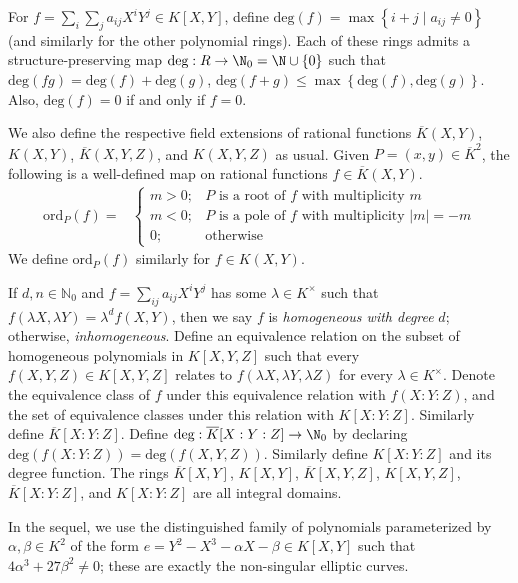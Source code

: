 \documentclass[11pt,letterpaper]{article}
\newcommand{\polys}{K[X,Y]}
\theoremstyle{definition}
\newcommand{\6}{\mathbf}
\newcommand{\7}{\mathcal}
\begin{document}
For $f = \sum_i \sum_j a_{ij} X^iY^j \in \polys$, define $\text{deg}(f) = \max \left\{i+j \mid a_{ij} \neq 0\right\}$ (and similarly for the other polynomial rings). Each of these rings admits a structure-preserving map $\text{deg}:R \to \N_0 = \N \cup \left\{0\right\}$ such that $\text{deg}(fg) = \text{deg}(f) + \text{deg}(g)$, $\text{deg}(f+g) \leq \max\left\{\text{deg}(f), \text{deg}(g)\right\}$. Also, $\text{deg}(f) = 0$ if and only if $f = 0$.

We also define the respective field extensions of rational functions $\overline{K}(X,Y)$, $K(X,Y)$, $\overline{K}(X,Y,Z)$, and $K(X,Y,Z)$ as usual. Given $P = (x,y) \in \overline{K}^2$, the following is a well-defined map on rational functions $f \in \overline{K}(X,Y)$.
\begin{align}
\text{ord}_P(f) =& \begin{cases} m > 0; & P\text{ is a root of }f\text{ with multiplicity }m \\ m < 0; & P\text{ is a pole of }f\text{ with multiplicity }\left|m\right|=-m \\ 0; & \text{otherwise} \end{cases}
\end{align} We define $\text{ord}_P(f)$ similarly for $f \in K(X,Y)$.

If $d, n \in \mathbb{N}_0$ and $f = \sum_{ij} a_{ij}X^iY^j$ has some $\lambda \in K^\times$ such that $f(\lambda X, \lambda Y) = \lambda^d f(X,Y)$, then we say $f$ is \textit{homogeneous with degree} $d$; otherwise, \textit{inhomogeneous}. Define an equivalence relation on the subset of homogeneous polynomials in $K[X,Y,Z]$ such that every $f(X,Y,Z) \in K[X,Y,Z]$ relates to $f(\lambda X, \lambda Y, \lambda Z)$ for every $\lambda \in K^\times$. Denote the equivalence class of $f$ under this equivalence relation with $f(X\!:\!Y\!:\!Z)$, and the set of equivalence classes under this relation with $K[X\!:\!Y\!:\!Z]$. Similarly define $\overline{K}[X\!:\!Y\!:\!Z]$.
Define $\text{deg}:\overline{K}[X:Y:Z] \to \N_0$ by declaring $\text{deg}(f(X\!:\!Y\!:\!Z)) = \text{deg}(f(X,Y,Z))$. Similarly define $K[X\!:\!Y\!:\!Z]$ and its degree function. The rings $\overline{K}[X,Y]$, $K[X,Y]$, $\overline{K}[X,Y,Z]$, $K[X,Y,Z]$, $\overline{K}[X\!:\!Y\!:\!Z]$, and $K[X\!:\!Y\!:\!Z]$ are all integral domains. 

In the sequel, we use the distinguished family of polynomials parameterized by $\alpha, \beta \in K^2$ of the form $e = Y^2 - X^3 - \alpha X - \beta \in K[X,Y]$ such that $4\alpha^3 + 27\beta^2 \neq 0$; these are exactly the non-singular elliptic curves.
\end{document}
